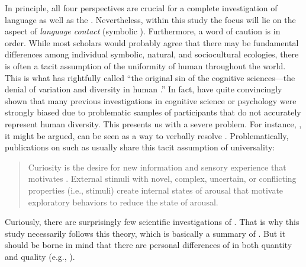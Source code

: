 In principle, all four perspectives are crucial for a complete investigation of language as well as the . Nevertheless, within this study the focus will lie on the aspect of \textit{language contact} (symbolic ). Furthermore, a word of caution is in order. While most scholars would probably agree that there may be fundamental differences among individual symbolic, natural, and sociocultural ecologies, there is often a tacit assumption of the uniformity of human  throughout the world. This is what \citet[397]{Levinson2012a} has rightfully called “the original sin of the cognitive sciences---the denial of variation and diversity in human .” In fact, \citet[61]{HenrichHeineNorenzayan2010} have quite convincingly shown that many previous investigations in cognitive science or psychology were strongly biased due to problematic samples of participants that do not accurately represent human diversity. This presents us with a severe problem. For instance, , it might be argued, can be seen as a way to verbally resolve . Problematically, publications on  such as \citet[453]{Reio2011} usually share this tacit assumption of universality:

\begin{quote}
Curiosity is the desire for new information and sensory experience that motivates . External stimuli with novel, complex, uncertain, or conflicting properties (i.e.,  stimuli) create internal states of arousal that motivate exploratory behaviors to reduce the state of arousal.
\end{quote}

\noindent Curiously, there are surprisingly few scientific investigations of . That is why this study necessarily follows this theory, which is basically a summary of \cite{Berlyne1954,Berlyne1960,Berlyne1978}. But it should be borne in mind that there are personal differences of  in both quantity and quality (e.g., \citealt{vonStummHellChamorroPremuzic2011}).

